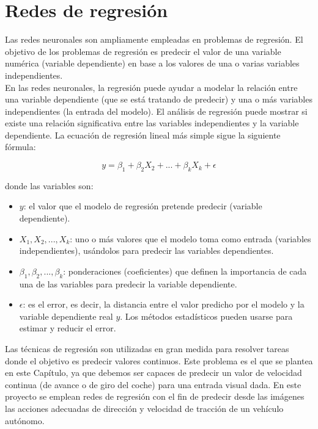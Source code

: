 \chapter{Redes de regresión}\label{cap.regresion}

Las redes neuronales son ampliamente empleadas en problemas de regresión. El objetivo de los problemas de regresión es predecir el valor de una variable numérica (variable dependiente) en base a los valores de una o varias variables independientes.\\

En las redes neuronales, la regresión puede ayudar a modelar la relación entre una variable dependiente (que se está tratando de predecir) y una o más variables independientes (la entrada del modelo). El análisis de regresión puede mostrar si existe una relación significativa entre las variables independientes y la variable dependiente. La ecuación de regresión lineal más simple sigue la siguiente fórmula:

\[ y = \beta_{1} + \beta_{2} X_{2} + ... + \beta_{k} X_{k} + \epsilon  \]

donde las variables son:

\begin{itemize}
    \item \(y\): el valor que el modelo de regresión pretende predecir (variable dependiente).
    \item \(X_{1}, X_{2},... , X_{k}\): uno o más valores que el modelo toma como entrada (variables independientes), usándolos para predecir las variables dependientes.
    \item \(\beta_{1}, \beta_{2},... , \beta_{k}\): ponderaciones (coeficientes) que definen la importancia de cada una de las variables para predecir la variable dependiente.
    \item \(\epsilon\): es el error, es decir, la distancia entre el valor predicho por el modelo y la variable dependiente real \(y\). Los métodos estadísticos pueden usarse para estimar y reducir el  error.
\end{itemize}

Las técnicas de regresión son utilizadas en gran medida para resolver tareas donde el objetivo es predecir valores continuos. Este problema es el que se plantea en este Capítulo, ya que debemos ser capaces de predecir un valor de velocidad continua (de avance o de giro del coche) para una entrada visual dada. En este proyecto se emplean redes de regresión con el fin de predecir desde las imágenes las acciones adecuadas de dirección y velocidad de tracción de un vehículo autónomo.\\



